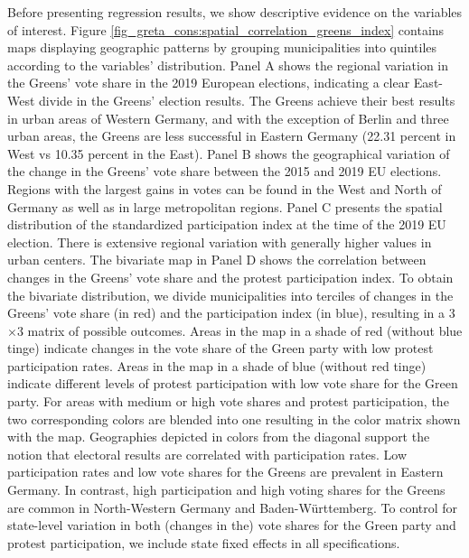 Before presenting regression results, we show descriptive evidence on the variables of interest. Figure \ref{fig_greta_cons:spatial_correlation_greens_index} contains maps displaying geographic patterns by grouping municipalities into quintiles according to the variables' distribution. Panel A shows the regional variation in the Greens' vote share in the 2019 European elections, indicating a clear East-West divide in the Greens' election results. The Greens achieve their best results in urban areas of Western Germany, and with the exception of Berlin and three urban areas, the Greens are less successful in Eastern Germany (22.31 percent in West vs 10.35 percent in the East). Panel B shows the geographical variation of the change in the Greens' vote share between the 2015 and 2019 EU elections. Regions with the largest gains in votes can be found in the West and North of Germany as well as in large metropolitan regions. Panel C presents the spatial distribution of the standardized participation index at the time of the 2019 EU election. There is extensive regional variation with generally higher values in urban centers. The bivariate map in Panel D shows the correlation between changes in the Greens' vote share and the protest participation index. To obtain the bivariate distribution, we divide municipalities into terciles of changes in the Greens' vote share (in red) and the participation index (in blue), resulting in a 3$\times$3 matrix of possible outcomes. Areas in the map in a shade of red (without blue tinge) indicate changes in the vote share of the Green party with low protest participation rates. Areas in the map in a shade of blue (without red tinge) indicate different levels of protest participation with low vote share for the Green party. For areas with medium or high vote shares and protest participation, the two corresponding colors are blended into one resulting in the color matrix shown with the map. Geographies depicted in colors from the diagonal support the notion that electoral results are correlated with participation rates. Low participation rates and low vote shares for the Greens are prevalent in Eastern Germany. In contrast, high participation and high voting shares for the Greens are common in North-Western Germany and Baden-Württemberg. To control for state-level variation in both (changes in the) vote shares for the Green party and protest participation, we include state fixed effects in all specifications.





